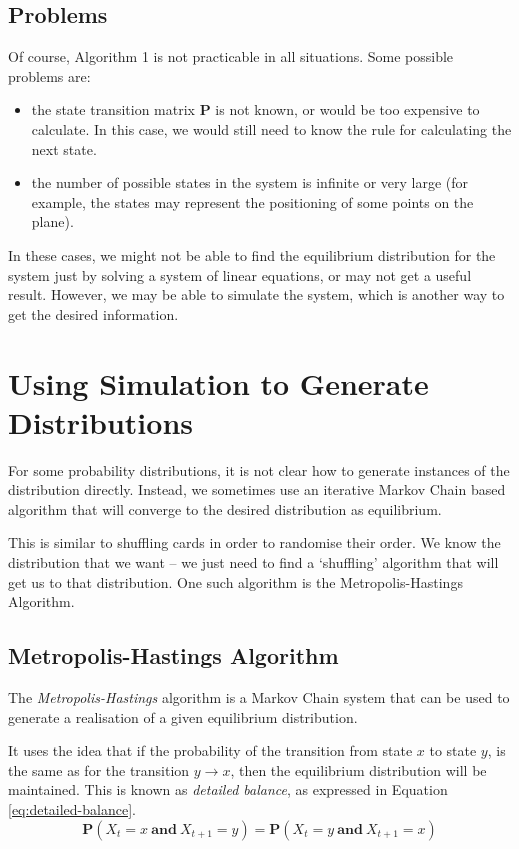 \subsection{Problems}

Of course, Algorithm 1 is not practicable in all situations.  Some
possible problems are:

\begin{itemize}
\item the state transition matrix $\mathbf{P}$ is not known, or would
be too expensive to calculate.  In this case, we would still need to
know the rule for calculating the next state.
\item the number of possible states in the system is infinite or very
large (for example, the states may represent the positioning of some
points on the plane).
\end{itemize}

In these cases, we might not be able to find the equilibrium
distribution for the system just by solving a system of linear
equations, or may not get a useful result.  However, we may be able to
simulate the system, which is another way to get the desired
information.

\section{Using Simulation to Generate Distributions}

For some probability distributions, it is not clear how to generate
instances of the distribution directly.  Instead, we sometimes use an
iterative Markov Chain based algorithm that will converge to the
desired distribution as equilibrium.

This is similar to shuffling cards in order to randomise their order.
We know the distribution that we want -- we just need to find a
`shuffling' algorithm that will get us to that distribution.  One such
algorithm is the Metropolis-Hastings Algorithm.

\subsection{Metropolis-Hastings Algorithm}

The \emph{Metropolis-Hastings} algorithm is a Markov Chain system that
can be used to generate a realisation of a given equilibrium
distribution.

It uses the idea that if the probability of the transition from state
$x$ to state $y$, is the same as for the transition $y \to x$, then
the equilibrium distribution will be maintained.  This is known as
\emph{detailed balance}, as expressed in Equation
\ref{eq:detailed-balance}.
\begin{equation}\label{eq:detailed-balance}
\mathbf{P}(X_t = x\ \mathbf{and}\ X_{t+1} = y) =
   \mathbf{P}(X_t = y\ \mathbf{and}\ X_{t+1} = x)
\end{equation}


